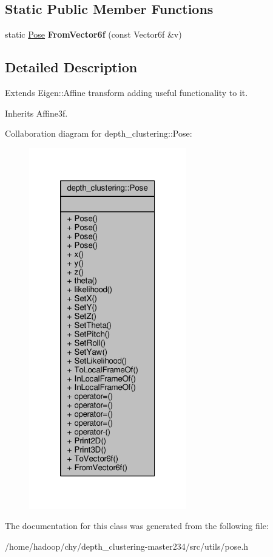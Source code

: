 \subsection*{Static Public Member Functions}
\begin{DoxyCompactItemize}
\item 
\hypertarget{classdepth__clustering_1_1Pose_a7bbd2374e9891af96c546015a2f2d4d3}{static \hyperlink{classdepth__clustering_1_1Pose}{Pose} {\bfseries From\-Vector6f} (const Vector6f \&v)}\label{classdepth__clustering_1_1Pose_a7bbd2374e9891af96c546015a2f2d4d3}

\end{DoxyCompactItemize}


\subsection{Detailed Description}
Extends Eigen\-::\-Affine transform adding useful functionality to it. 

Inherits Affine3f.



Collaboration diagram for depth\-\_\-clustering\-:\-:Pose\-:
\nopagebreak
\begin{figure}[H]
\begin{center}
\leavevmode
\includegraphics[width=194pt]{classdepth__clustering_1_1Pose__coll__graph}
\end{center}
\end{figure}


The documentation for this class was generated from the following file\-:\begin{DoxyCompactItemize}
\item 
/home/hadoop/chy/depth\-\_\-clustering-\/master234/src/utils/pose.\-h\end{DoxyCompactItemize}
